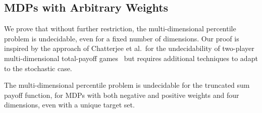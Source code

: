 \documentclass{llncs}
\begin{document}
\subsection{MDPs with Arbitrary Weights}

We prove that without further restriction, the multi-dimen\-sion\-al percentile problem is undecidable, even for a fixed number of dimensions. Our proof is inspired by the approach of Chatterjee et al.~for the undecidability of two-player multi-dimensional total-payoff games~\cite{DBLP:journals/iandc/Chatterjee0RR15} but requires additional techniques to adapt to the stochastic case. 

\begin{theorem}
\label{thm:truncated_undec}
The multi-dimensional percentile problem is undecidable for the truncated sum payoff function, for MDPs with both negative and positive weights and four dimensions, even with a unique target set.
\end{theorem}
\end{document}
